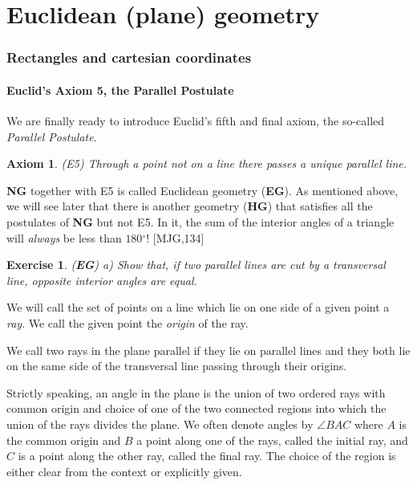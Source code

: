 \documentclass{article}%
\providecommand{\U}[1]{\protect\rule{.1in}{.1in}}
\newtheorem{axiom}[theorem]{Axiom}
\newtheorem{exercise}[theorem]{Exercise}
\begin{document}
\part{Euclidean (plane) geometry\label{IV}}

\section{Rectangles and cartesian coordinates}

\subsection{Euclid's Axiom 5, the Parallel Postulate}

We are finally ready to introduce Euclid's fifth and final axiom, the
so-called \textit{Parallel Postulate}.

\begin{axiom}
(E5) Through a point not on a line there passes a unique parallel line.
\end{axiom}

\textbf{NG} together with E5 is called Euclidean geometry (\textbf{EG}). As
mentioned above, we will see later that there is another geometry
(\textbf{HG}) that satisfies all the postulates of \textbf{NG} but not E5. In
it, the sum of the interior angles of a triangle will \textit{always} be less
than $180%
{{}^\circ}%
$! [MJG,134]

\begin{exercise}
\label{24}(\textbf{EG}) a) Show that, if two parallel lines are cut by a
transversal line, opposite interior angles are equal.
\end{exercise}

We will call the set of points on a line which lie on one side of a given
point a \textit{ray}. We call the given point the \textit{origin} of the ray.

We call two rays in the plane parallel if they lie on parallel lines and they
both lie on the same side of the transversal line passing through their origins.

Strictly speaking, an angle in the plane is the union of two ordered rays with
common origin and choice of one of the two connected regions into which the
union of the rays divides the plane. We often denote angles by $\angle BAC$
where $A$ is the common origin and $B$ a point along one of the rays, called
the initial ray, and $C$ is a point along the other ray, called the final ray.
The choice of the region is either clear from the context or explicitly given.
\end{document}
